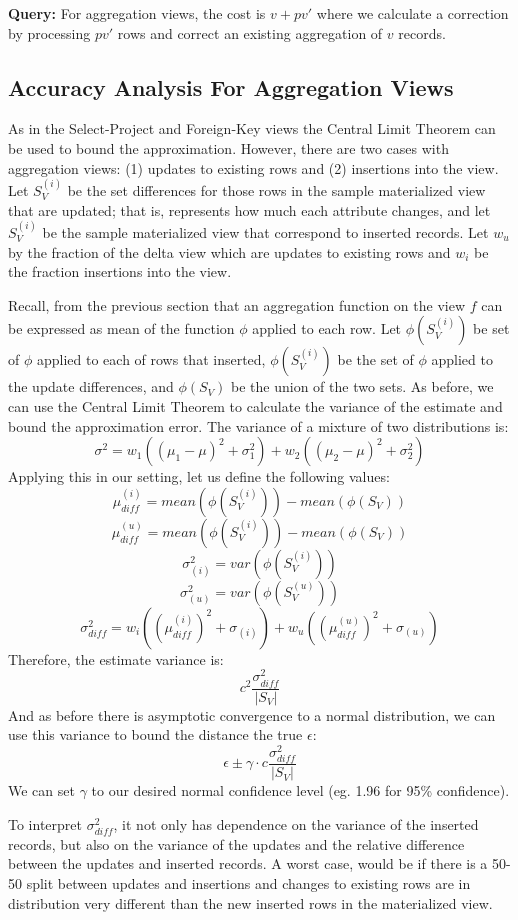 \textbf{Query: } For aggregation views, the cost is $v + pv'$ where we calculate a correction by processing $pv'$ rows and correct an existing aggregation of $v$ records.

\subsection{Accuracy Analysis For Aggregation Views}
As in the Select-Project and Foreign-Key views the Central Limit Theorem can
be used to bound the approximation.
However, there are two cases with aggregation views: (1) updates to existing rows and (2) insertions into the view.
Let $S_{V}^{(i)}$ be the set differences for those rows in the sample materialized view that are updated; that is, represents how much each attribute 
changes, and let $S_{V}^{(i)}$ be the sample materialized view that correspond to inserted records.
Let $w_u$ by the fraction of the delta view which are updates to existing rows and $w_i$ be the fraction insertions into the view.

Recall, from the previous section that an aggregation function on the view $f$ can be expressed as mean of the function $\phi$ applied to each row.
Let $\phi(S_{V}^{(i)})$ be set of $\phi$ applied to each of rows that inserted, $\phi(S_{V}^{(i)})$ be the set of $\phi$ applied to the update differences, and $\phi(S_{V})$ be the union of the two sets.
As before, we can use the Central Limit Theorem to calculate the variance of the estimate and bound the approximation error.
The variance of a mixture of two distributions is:
\[
\sigma^2 = w_1((\mu_1-\mu)^2 + \sigma^2_1) + w_2((\mu_2-\mu)^2 + \sigma^2_2)
\]
Applying this in our setting, let us define the following values:
\[
\mu^{(i)}_{diff} = mean(\phi(S_{V}^{(i)})) - mean(\phi(S_{V}))
\]
\[
\mu^{(u)}_{diff} = mean(\phi(S_{V}^{(i)})) - mean(\phi(S_{V}))
\]
\[
\sigma^2_{(i)} = var(\phi(S_{V}^{(i)}))
\]
\[
\sigma^2_{(u)} = var(\phi(S_{V}^{(u)}))
\]
\[
\sigma^2_{diff} = w_i((\mu^{(i)}_{diff})^2 + \sigma_{(i)}) + w_u((\mu^{(u)}_{diff})^2 + \sigma_{(u)})
\] 
Therefore, the estimate variance is:
\[
c^2\frac{\sigma^2_{diff}}{|S_{V}|}
\]
And as before there is asymptotic convergence to a normal distribution, we can use this variance to bound the distance the true $\epsilon$:   
\[
\epsilon \pm \gamma \cdot c\frac{\sigma^2_{diff}}{|S_{V}|}
\]
We can set $\gamma$ to our desired normal confidence level (eg. 1.96 for 95\% confidence).

To interpret $\sigma^2_{diff}$, it not only has dependence on the variance of the inserted records, but also on the variance of the updates and the relative difference between the updates and inserted records. 
A worst case, would be if there is a 50-50 split between updates and insertions and changes to existing rows are in distribution very different than the new inserted rows in the materialized view. 

